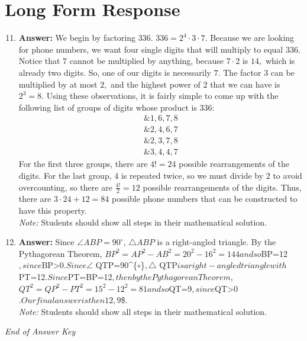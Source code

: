 \documentclass[12pt]{article}
\begin{document}
\section*{Long Form Response}
\begin{enumerate}[label=\arabic*.]
\setcounter{enumi}{10}
\item \textbf{Answer:} We begin by factoring $336$. $336 = 2^4 \cdot 3 \cdot 7.$ Because we are looking for phone numbers, we want four single digits that will multiply to equal $336.$ Notice that $7$ cannot be multiplied by anything, because $7 \cdot 2$ is $14,$ which is already two digits. So, one of our digits is necessarily $7.$ The factor $3$ can be multiplied by at most $2,$ and the highest power of $2$ that we can have is $2^3 = 8.$ Using these observations, it is fairly simple to come up with the following list of groups of digits whose product is $336:$ \begin{align*} \&1, 6, 7, 8\\ \&2, 4, 6, 7\\ \&2, 3, 7, 8 \\ \&3, 4, 4, 7 \end{align*}For the first three groups, there are $4! = 24$ possible rearrangements of the digits. For the last group, $4$ is repeated twice, so we must divide by $2$ to avoid overcounting, so there are $\frac{4!}{2} = 12$ possible rearrangements of the digits. Thus, there are $3 \cdot 24 + 12 = \boxed{84}$ possible phone numbers that can be constructed to have this property.
\\ \textit{Note:} Students should show all steps in their mathematical solution.
\item \textbf{Answer:} Since $\angle ABP=90^{\circ}$, $\triangle ABP$ is a right-angled triangle. By the Pythagorean Theorem, $BP^2=AP^2-AB^2=20^2-16^2=144$$ and so $BP=12$, since $BP\textgreater{}0$. Since $\ensuremath{\angle} QTP=90^\{\ensuremath{\circ}\}$, $\ensuremath{\triangle} QTP$ is a right-angled triangle with $PT=12$. Since $PT=BP=12$, then by the Pythagorean Theorem, $$QT^2=QP^2-PT^2=15^2-12^2 = 81$$ and so $QT=9$, since $QT\textgreater{}0$. Our final answer is then $\ensuremath{\boxed{12,9}}\$.
\\ \textit{Note:} Students should show all steps in their mathematical solution.
\end{enumerate}

\vfill
\noindent\textit{End of Answer Key}
\end{document}
